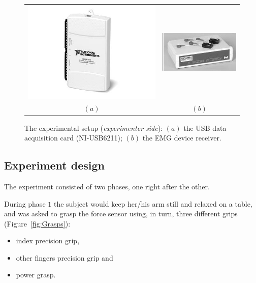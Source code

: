\begin{figure}[!t] \centering
  \begin{tabular}{cc}
   \includegraphics[height=0.16\textheight]{figs/NI-6211} &
    \includegraphics[height=0.16\textheight]{figs/Zero_Base} \\
  $(a)$ & $(b)$\\
  \end{tabular}
  \caption{The experimental setup (\textit{experimenter side}): $(a)$
   the USB data acquisition card (NI-USB6211); $(b)$ the EMG device
   receiver.}
  \label{fig:ExpSetup}
\end{figure}

\subsection{Experiment design}

The experiment consisted of two phases, one right after the
other.

During phase $1$ the subject would keep her/his arm still and relaxed
on a table, and was asked to grasp the force sensor using, in turn,
three different grips (Figure~\ref{fig:Grasps}):

\begin{itemize}
  \item index precision grip,
  \item other fingers precision grip and
  \item power grasp.
\end{itemize}

